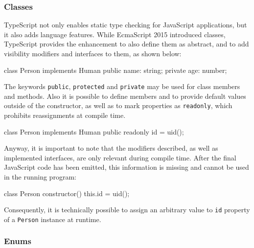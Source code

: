 \subsubsection{Classes}
\label{sec:ts-classes}

TypeScript not only enables static type checking for JavaScript applications, but it also adds language features. While EcmaScript 2015 introduced classes, TypeScript provides the enhancement to also define them as abstract, and to add visibility modifiers and interfaces to them, as shown below:
\begin{JsCode}[numbers=none]
class Person implements Human {
  public name: string;
  private age: number;
}
\end{JsCode}
The keywords \texttt{public}, \texttt{protected} and \texttt{private} may be used for class members and methods. Also it is possible to define members and to provide default values outside of the constructor, as well as to mark properties as \texttt{readonly}, which prohibits reassignments at compile time.
\begin{JsCode}[numbers=none]
class Person implements Human {
  public readonly id = uid();
}
\end{JsCode}
Anyway, it is important to note that the modifiers described, as well as implemented interfaces, are only relevant during compile time. After the final JavaScript code has been emitted, this information is missing and cannot be used in the running program:
\begin{JsCode}[numbers=none]
class Person {
  constructor() {
    this.id = uid();
  }
}
\end{JsCode}
Consequently, it is technically possible to assign an arbitrary value to \texttt{id} property of a \texttt{Person} instance at runtime.

\subsubsection{Enums}
\label{sec:ts-enums}

